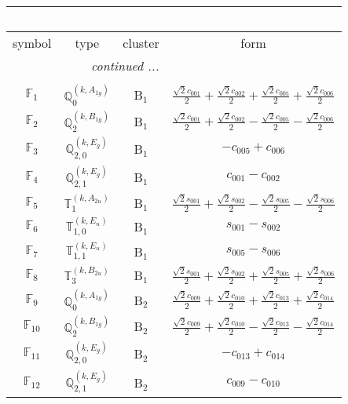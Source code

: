 \documentclass[fleqn,10pt,landscape]{article}
\begin{document}
\begin{itemize}
\begin{center}
\begin{longtable}{c|c|c|c}
\multicolumn{3}{l}{\tablename\ \thetable{}} \\
 \hline \hline
symbol & type & cluster & form \\ \hline \endhead

 \hline \hline
\multicolumn{3}{r}{\footnotesize\it continued ...} \\ \endfoot

 \hline \hline
\multicolumn{3}{r}{} \\ \endlastfoot

$ \mathbb{F}_{1} $ & $\mathbb{Q}_{0}^{(k,A_{1g})}$ & B$_{1}$ & $\frac{\sqrt{2} c_{001}}{2} + \frac{\sqrt{2} c_{002}}{2} + \frac{\sqrt{2} c_{005}}{2} + \frac{\sqrt{2} c_{006}}{2}$ \\
$ \mathbb{F}_{2} $ & $\mathbb{Q}_{2}^{(k,B_{1g})}$ & B$_{1}$ & $\frac{\sqrt{2} c_{001}}{2} + \frac{\sqrt{2} c_{002}}{2} - \frac{\sqrt{2} c_{005}}{2} - \frac{\sqrt{2} c_{006}}{2}$ \\
$ \mathbb{F}_{3} $ & $\mathbb{Q}_{2,0}^{(k,E_{g})}$ & B$_{1}$ & $- c_{005} + c_{006}$ \\
$ \mathbb{F}_{4} $ & $\mathbb{Q}_{2,1}^{(k,E_{g})}$ & B$_{1}$ & $c_{001} - c_{002}$ \\
$ \mathbb{F}_{5} $ & $\mathbb{T}_{1}^{(k,A_{2u})}$ & B$_{1}$ & $\frac{\sqrt{2} s_{001}}{2} + \frac{\sqrt{2} s_{002}}{2} - \frac{\sqrt{2} s_{005}}{2} - \frac{\sqrt{2} s_{006}}{2}$ \\
$ \mathbb{F}_{6} $ & $\mathbb{T}_{1,0}^{(k,E_{u})}$ & B$_{1}$ & $s_{001} - s_{002}$ \\
$ \mathbb{F}_{7} $ & $\mathbb{T}_{1,1}^{(k,E_{u})}$ & B$_{1}$ & $s_{005} - s_{006}$ \\
$ \mathbb{F}_{8} $ & $\mathbb{T}_{3}^{(k,B_{2u})}$ & B$_{1}$ & $\frac{\sqrt{2} s_{001}}{2} + \frac{\sqrt{2} s_{002}}{2} + \frac{\sqrt{2} s_{005}}{2} + \frac{\sqrt{2} s_{006}}{2}$ \\ \hline
$ \mathbb{F}_{9} $ & $\mathbb{Q}_{0}^{(k,A_{1g})}$ & B$_{2}$ & $\frac{\sqrt{2} c_{009}}{2} + \frac{\sqrt{2} c_{010}}{2} + \frac{\sqrt{2} c_{013}}{2} + \frac{\sqrt{2} c_{014}}{2}$ \\
$ \mathbb{F}_{10} $ & $\mathbb{Q}_{2}^{(k,B_{1g})}$ & B$_{2}$ & $\frac{\sqrt{2} c_{009}}{2} + \frac{\sqrt{2} c_{010}}{2} - \frac{\sqrt{2} c_{013}}{2} - \frac{\sqrt{2} c_{014}}{2}$ \\
$ \mathbb{F}_{11} $ & $\mathbb{Q}_{2,0}^{(k,E_{g})}$ & B$_{2}$ & $- c_{013} + c_{014}$ \\
$ \mathbb{F}_{12} $ & $\mathbb{Q}_{2,1}^{(k,E_{g})}$ & B$_{2}$ & $c_{009} - c_{010}$ \\

\end{longtable}
\end{center}
\end{itemize}
\end{document}
